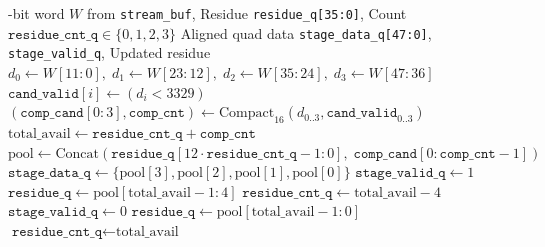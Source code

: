 \begin{algorithm}[!t]
\caption{Pipelined 4-Way Rejection Sampling and Residue Packing}
\label{alg:rejection_sampling}
\begin{algorithmic}[1]
-bit word $W$ from \texttt{stream\_buf}, Residue \texttt{residue\_q[35:0]}, Count $\texttt{residue\_cnt\_q} \in \{0, 1, 2, 3\}$
\Ensure Aligned quad data \texttt{stage\_data\_q[47:0]}, \texttt{stage\_valid\_q}, Updated residue
\State $d_0 \leftarrow W[11:0], \; d_1 \leftarrow W[23:12], \; d_2 \leftarrow W[35:24], \; d_3 \leftarrow W[47:36]$
 
    \State $\texttt{cand\_valid}[i] \leftarrow (d_i < 3329)$
\EndFor
\State $(\texttt{comp\_cand}[0:3], \texttt{comp\_cnt}) \leftarrow \text{Compact}_{16}(d_{0..3}, \texttt{cand\_valid}_{0..3})$
\State $\text{total\_avail} \leftarrow \texttt{residue\_cnt\_q} + \texttt{comp\_cnt}$ 
\State $\text{pool} \leftarrow \text{Concat}(\texttt{residue\_q}[12 \cdot \texttt{residue\_cnt\_q} - 1 : 0], \; \texttt{comp\_cand}[0 : \texttt{comp\_cnt} - 1])$
    \State $\texttt{stage\_data\_q} \leftarrow \{\text{pool}[3], \text{pool}[2], \text{pool}[1], \text{pool}[0]\}$
    \State $\texttt{stage\_valid\_q} \leftarrow 1$
    \State $\texttt{residue\_q} \leftarrow \text{pool}[\text{total\_avail} - 1 : 4]$
    \State $\texttt{residue\_cnt\_q} \leftarrow \text{total\_avail} - 4$
\Else
    \State $\texttt{stage\_valid\_q} \leftarrow 0$
    \State $\texttt{residue\_q} \leftarrow \text{pool}[\text{total\_avail} - 1 : 0]$
    \State $\texttt{residue\_cnt\_q} \leftarrow \text{total\_avail}$
\EndIf
\end{algorithmic}
\end{algorithm}


